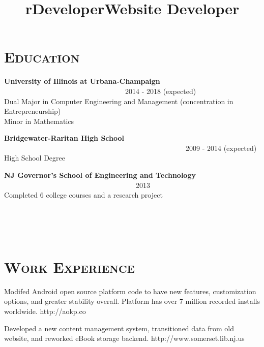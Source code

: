 \begin{resume}

\section{\textsc{Education}}

\textbf{University of Illinois at Urbana-Champaign} \ \ \ \ \ \ \ \ \ \ \ \ \ \ \ \ \ \ \ \ \ \ \ \ \ \ \ \ \ \ \ \ \ \ 2014 - 2018 (expected) \\
Dual Major in Computer Engineering and Management (concentration in Entrepreneurship) \\ Minor in Mathematics

\textbf{Bridgewater-Raritan High School} \ \ \ \ \ \ \ \ \ \ \ \ \ \ \ \ \ \ \ \ \ \ \ \ \ \ \ \ \ \ \ \ \ \ \ \ \ \ \ \ \ \ \ \ \ \ \ \ \ \ \ 2009 - 2014 (expected) \\
High School Degree

\textbf{NJ Governor's School of Engineering and Technology} \ \ \ \ \ \ \ \ \ \ \ \ \ \ \ \ \ \ \ \ \ \ \ \ \ \ \ \ \ \ \ \ \ \ \ \ \ 2013 \\ 
Completed 6 college courses and a research project

\begin{formatb}
  \title{r}\\
  \\
  \body\\
\end{formatb}

\section{\textsc{Work Experience}}

\title{Developer}
\begin{position}
Modifed Android open source platform code to have new features, customization options, and greater stability overall. Platform has over 7 million recorded installs worldwide. http://aokp.co
\end{position}

\title{Website Developer}
\begin{position}
Developed a new content management system, transitioned data from old website, and reworked eBook storage backend. http://www.somerset.lib.nj.us
\end{position}


\end{resume}
